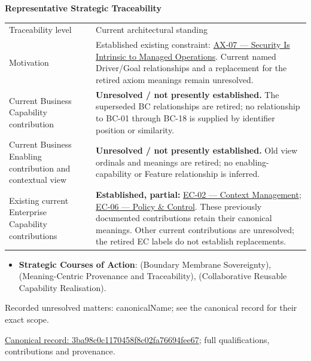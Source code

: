 \par\medskip\textbf{Representative Strategic Traceability}\par


\begin{longtable}{>{\raggedright\arraybackslash}p{}>{\raggedright\arraybackslash}p{}}
Traceability level & Current architectural standing \\
Motivation & Established existing constraint: \hyperref[element:5de2ae2c3b794c2d9f3a14efd51d564f]{AX-07 — Security Is Intrinsic to Managed Operations}. Current named Driver/Goal relationships and a replacement for the retired axiom meanings remain unresolved. \\
Current Business Capability contribution & \textbf{Unresolved / not presently established.} The superseded BC relationships are retired; no relationship to BC-01 through BC-18 is supplied by identifier position or similarity. \\
Current Business Enabling contribution and contextual view & \textbf{Unresolved / not presently established.} Old view ordinals and meanings are retired; no enabling-capability or Feature relationship is inferred. \\
Existing current Enterprise Capability contributions & \textbf{Established, partial:} \href{\detokenize{../../../../../docs/markdown/02-strategy/capabilities/enterprise-capabilities.md#ec-02-context-management}}{EC-02 — Context Management}; \href{\detokenize{../../../../../docs/markdown/02-strategy/capabilities/enterprise-capabilities.md#ec-06-policy--control}}{EC-06 — Policy \& Control}. These previously documented contributions retain their canonical meanings. Other current contributions are unresolved; the retired EC labels do not establish replacements. \\
\end{longtable}


\begin{itemize}


\item \textbf{Strategic Courses of Action}: \texttt{} (Boundary Membrane Sovereignty), \texttt{} (Meaning-Centric Provenance and Traceability), \texttt{} (Collaborative Reusable Capability Realisation).

\end{itemize}

{\small Recorded unresolved matters: canonicalName; see the canonical record for their exact scope.}\par
{\footnotesize \href{../../../../continuum/strategy/value-stream/3ba98c0c1170458f8c02fa76694fee67.md}{Canonical record: 3ba98c0c1170458f8c02fa76694fee67}; full qualifications, contributions and provenance.}\par
